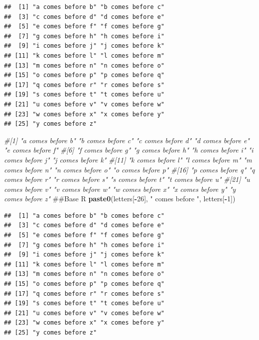 \documentclass[10pt,]{krantz}
\makeatletter
\newenvironment{Shaded}{\begin{snugshade}}{\end{snugshade}}
\newcommand{\KeywordTok}[1]{\textcolor[rgb]{0.13,0.29,0.53}{\textbf{#1}}}
\newcommand{\DecValTok}[1]{\textcolor[rgb]{0.00,0.00,0.81}{#1}}
\newcommand{\StringTok}[1]{\textcolor[rgb]{0.31,0.60,0.02}{#1}}
\newcommand{\CommentTok}[1]{\textcolor[rgb]{0.56,0.35,0.01}{\textit{#1}}}
\newcommand{\OperatorTok}[1]{\textcolor[rgb]{0.81,0.36,0.00}{\textbf{#1}}}
\newcommand{\NormalTok}[1]{#1}
\newenvironment{kframe}{%
\medskip{}
\setlength{\fboxsep}{.8em}
 \def\at@end@of@kframe{}%
 \ifinner\ifhmode%
  \def\at@end@of@kframe{\end{minipage}}%
  \begin{minipage}{\columnwidth}%
 \fi\fi%
 \def\FrameCommand##1{\hskip\@totalleftmargin \hskip-\fboxsep
 \colorbox{shadecolor}{##1}\hskip-\fboxsep
     \hskip-\linewidth \hskip-\@totalleftmargin \hskip\columnwidth}%
 \MakeFramed {\advance\hsize-\width
   \@totalleftmargin\z@ \linewidth\hsize
   \@setminipage}}%
 {\par\unskip\endMakeFramed%
 \at@end@of@kframe}
\renewenvironment{Shaded}{\begin{kframe}}{\end{kframe}}
\makeatother
\begin{document}
\begin{Shaded}
\end{Shaded}

\begin{verbatim}
##  [1] "a comes before b" "b comes before c"
##  [3] "c comes before d" "d comes before e"
##  [5] "e comes before f" "f comes before g"
##  [7] "g comes before h" "h comes before i"
##  [9] "i comes before j" "j comes before k"
## [11] "k comes before l" "l comes before m"
## [13] "m comes before n" "n comes before o"
## [15] "o comes before p" "p comes before q"
## [17] "q comes before r" "r comes before s"
## [19] "s comes before t" "t comes before u"
## [21] "u comes before v" "v comes before w"
## [23] "w comes before x" "x comes before y"
## [25] "y comes before z"
\end{verbatim}

\begin{Shaded}
\begin{Highlighting}[]
\CommentTok{#[1] "a comes before b" "b comes before c" "c comes before d" "d comes before e" "e comes before f"}
\CommentTok{#[6] "f comes before g" "g comes before h" "h comes before i" "i comes before j" "j comes before k"}
\CommentTok{#[11] "k comes before l" "l comes before m" "m comes before n" "n comes before o" "o comes before p"}
\CommentTok{#[16] "p comes before q" "q comes before r" "r comes before s" "s comes before t" "t comes before u"}
\CommentTok{#[21] "u comes before v" "v comes before w" "w comes before x" "x comes before y" "y comes before z"}
\NormalTok{##Base R}
\KeywordTok{paste0}\NormalTok{(letters[}\OperatorTok{-}\DecValTok{26}\NormalTok{], }\StringTok{" comes before "}\NormalTok{, letters[}\OperatorTok{-}\DecValTok{1}\NormalTok{])}
\end{Highlighting}
\end{Shaded}

\begin{verbatim}
##  [1] "a comes before b" "b comes before c"
##  [3] "c comes before d" "d comes before e"
##  [5] "e comes before f" "f comes before g"
##  [7] "g comes before h" "h comes before i"
##  [9] "i comes before j" "j comes before k"
## [11] "k comes before l" "l comes before m"
## [13] "m comes before n" "n comes before o"
## [15] "o comes before p" "p comes before q"
## [17] "q comes before r" "r comes before s"
## [19] "s comes before t" "t comes before u"
## [21] "u comes before v" "v comes before w"
## [23] "w comes before x" "x comes before y"
## [25] "y comes before z"
\end{verbatim}
\end{document}
